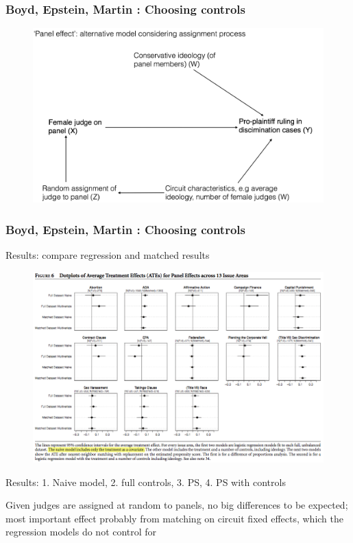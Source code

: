\documentclass[12pt,english,dvipsnames,aspectratio=169,handout]{beamer}\usepackage[]{graphicx}\usepackage[]{xcolor}
\begin{document}
\begin{frame}
	\frametitle{Boyd, Epstein, Martin \citeyear{boyd_untangling_2010}: Choosing controls}
	\footnotesize
  	 \begin{figure} 
    \includegraphics[height=.8\textheight,keepaspectratio=true]{../04-figures/06/09-w6_dag_random}
    \end{figure}
\end{frame}



\begin{frame}
	\frametitle{Boyd, Epstein, Martin \citeyear{boyd_untangling_2010}: Choosing controls}
	\footnotesize
  Results: compare regression and matched results
  	 \begin{figure} 
    \includegraphics[height=.5\textheight,keepaspectratio=true]{../04-figures/06/10-w6_results}
    \end{figure}
    \tiny
    Results: 1. Naive model, 2. full controls, 3. PS, 4. PS with controls
    
    \scriptsize
    Given judges are assigned at random to panels, no big differences to be expected; most important effect probably from matching on circuit fixed effects, which the regression models do not control for
\end{frame}
\end{document}

